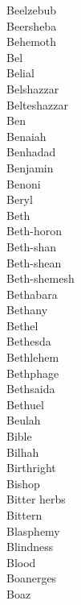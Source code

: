 Beelzebub  \\
Beersheba  \\
Behemoth  \\
Bel  \\
Belial  \\
Belshazzar  \\
Belteshazzar  \\
Ben  \\
Benaiah  \\
Benhadad  \\
Benjamin  \\
Benoni  \\
Beryl  \\
Beth  \\
Beth-horon  \\
Beth-shan  \\
Beth-shean  \\
Beth-shemesh  \\
Bethabara  \\
Bethany  \\
Bethel  \\
Bethesda  \\
Bethlehem  \\
Bethphage  \\
Bethsaida  \\
Bethuel  \\
Beulah  \\
Bible  \\
Bilhah  \\
Birthright  \\
Bishop  \\
Bitter herbs  \\
Bittern  \\
Blasphemy  \\
Blindness  \\
Blood  \\
Boanerges  \\
Boaz  \\
